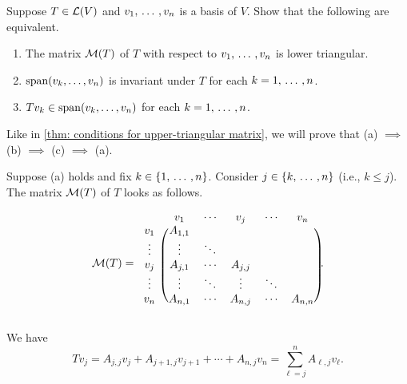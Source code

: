 \begin{xrcs}
  Suppose $T \in \mathcal{L}(V)$ and $v_1, {\, \ldots \,\,}, v_n$ is a basis of $V$. Show that the following are equivalent.
  \begin{enumerate}[label=\textbf{(\alph*)}]
    \item The matrix $\mathcal{M}(T)$ of $T$ with respect to $v_1, {\, \ldots \,\,}, v_n$ is lower triangular.
    \item $\operatorname{span} (v_k, \dots, v_n)$ is invariant under $T$ for each $k = 1, {\, \ldots \,\,}, n$.
    \item $T v_k \in \operatorname{span} (v_k, \dots, v_n)$ for each $k = 1, {\, \ldots \,\,}, n$.
  \end{enumerate}

  \begin{xprf}
    Like in \ref{thm: conditions for upper-triangular matrix}, we will prove that (a) $\implies$ (b) $\implies$ (c) $\implies$ (a).

    \StepOne Suppose (a) holds and fix $k \in \{1, {\, \ldots \,\,}, n \}$. Consider $j \in \{k, {\, \ldots \,\,}, n\}$ (i.e., $k  \leq j$). The matrix $\mathcal{M}(T)$ of $T$ looks as follows.

    \begin{minipage}{\linewidth}
      \begin{equation}
        \mathcal{M} (T) =
        \begin{blockarray}{cccccc}
          & v_1     & \cdots & v_j    &   \cdots & v_n     \\
          \begin{block}{c(ccccc)}
            v_1    & A_{1,1} &        &          &        &  \\
            \vdots & \vdots  & \ddots &          &        &  \\
            v_j &    A_{j,1} & \cdots & A_{j,j}  &        &  \\
            \vdots & \vdots  & \ddots & \vdots   & \ddots &  \\
            v_n    & A_{n,1} & \cdots & A_{n,j}  & \cdots & A_{n,n} \\
          \end{block}
        \end{blockarray}.
      \end{equation}
    \end{minipage}

    We have
    \begin{equation}
      Tv_j = A_{j,j} v_{j} + A_{j+1,j} v_{j+1} + \cdots + A_{n,j} v_{n} = \sum_{\ell=j}^{n} A_{\ell,j} v_\ell.
    \end{equation}


\end{xprf}
\end{xrcs}
